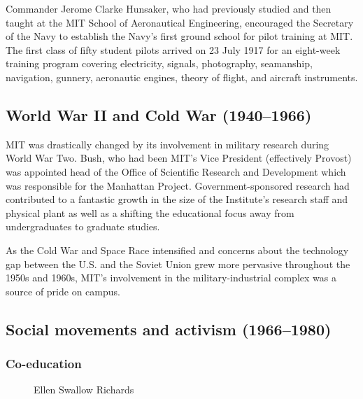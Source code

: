 Commander Jerome Clarke Hunsaker, who had previously studied and then taught at the MIT School of Aeronautical Engineering, encouraged the Secretary of the Navy to establish the Navy's first ground school for pilot training at MIT. The first class of fifty student pilots arrived on 23 July 1917 for an eight-week training program covering electricity, signals, photography, seamanship, navigation, gunnery, aeronautic engines, theory of flight, and aircraft instruments.


\subsection{World War II and Cold War (1940–1966)}

MIT was drastically changed by its involvement in military research during World War Two. Bush, who had been MIT's Vice President (effectively Provost) was appointed head of the Office of Scientific Research and Development which was responsible for the Manhattan Project. Government-sponsored research had contributed to a fantastic growth in the size of the Institute's research staff and physical plant as well as a shifting the educational focus away from undergraduates to graduate studies.

As the Cold War and Space Race intensified and concerns about the technology gap between the U.S. and the Soviet Union grew more pervasive throughout the 1950s and 1960s, MIT's involvement in the military-industrial complex was a source of pride on campus.

\subsection {Social movements and activism (1966–1980)}

\subsubsection {Co-education}

\begin{figure}[h]
\caption{Ellen Swallow Richards}
\end{figure}

